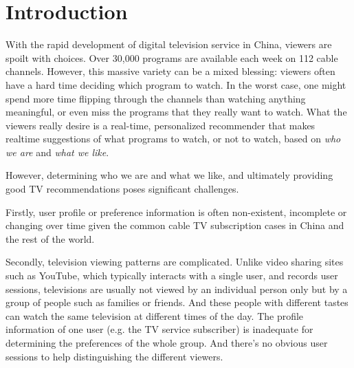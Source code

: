\section{Introduction}
\label{sec:intro}

With the rapid development of digital television service
in China, viewers are spoilt with choices.
Over 30,000 programs are available each week
on 112 cable channels.
However, this massive variety can be a mixed blessing:
viewers often have a hard time deciding which program
to watch. In the worst case, one might spend more time
flipping through the channels than watching anything
meaningful, or even miss the programs that they really
want to watch.
What the viewers really desire is a real-time, personalized
recommender that makes realtime suggestions of
what programs to watch, or not to watch,
based on {\em who we are} and {\em what we like}.



However, determining who we are and what we like,
and ultimately providing good TV recommendations poses
significant challenges.

Firstly, user profile or preference information is
often non-existent, incomplete or changing over time given
the common cable TV subscription cases in China and the
rest of the world.

Secondly, television viewing patterns are complicated. Unlike
video sharing sites such as YouTube, which typically
interacts with a single user, and records user sessions,
televisions are usually not viewed by an
individual person only but by a group of people such as
families or friends. And these people with different tastes
can watch the same television at different times of the day.
The profile information of
one user (e.g. the TV service subscriber) is inadequate
for determining the preferences of the whole group.
And there's no obvious user sessions to help
distinguishing the different viewers.

